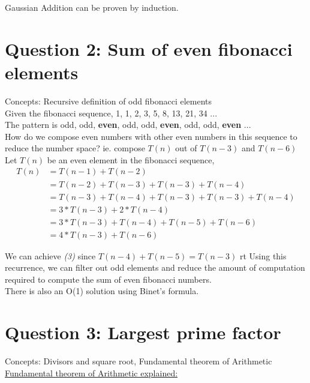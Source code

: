 \documentclass[12pt]{article}
\begin{document}
Gaussian Addition can be proven by induction. \\ [\baselineskip]
\pagebreak

\section{Question 2: Sum of even fibonacci elements} 
Concepts: Recursive definition of odd fibonacci elements \\ [\baselineskip]

Given the fibonacci sequence, 1, 1, 2, 3, 5, 8, 13, 21, 34 ... \\

The pattern is odd, odd, {\textbf{even}}, odd, odd, {\textbf{even}}, odd, odd, {\textbf{even}} ... \\
How do we compose even numbers with other even numbers in this sequence to reduce the number space? 
ie. compose \(T(n)\) out of \(T(n - 3)\) and \(T(n - 6)\) \\ [\baselineskip]

Let \(T(n)\) be an even element in the fibonacci sequence, 
\begin{align}
T(n) & = T(n - 1) + T(n - 2) \nonumber \\
& = T(n - 2) + T(n - 3) + T(n - 3) + T(n - 4) \nonumber  \\
&= T(n - 3) + T( n - 4) + T(n - 3) + T(n - 3) + T(n - 4) \nonumber  \\
&= 3 * T(n - 3) + 2 * T(n -4) \nonumber \\
& = 3 * T(n - 3) + T(n -4) + T(n - 5) + T(n -6) \nonumber  \\ 
& = 4 * T(n -3) + T(n - 6) 
\end{align}

We can achieve {\emph{(3)}} since \(T(n - 4) + T(n - 5) = T(n - 3)\)
rt
Using this recurrence, we can filter out odd elements and reduce the amount of computation required to compute the sum of even fibonacci numbers. \\ [\baselineskip]

There is also an O(1) solution using Binet's formula. 

\section{Question 3: Largest prime factor} 
Concepts: Divisors and square root, Fundamental theorem of Arithmetic \\ [\baselineskip]

{\underline{Fundamental theorem of Arithmetic explained:}} \\
\end{document}
